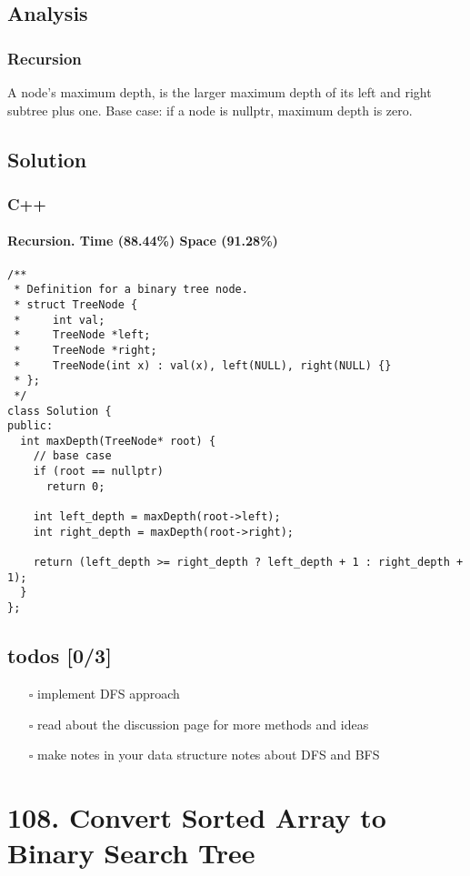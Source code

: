 \documentclass[11pt]{article}
\begin{document}
\subsection{Analysis}
\label{sec:org394cd99}
\subsubsection{Recursion}
\label{sec:org9e3ee56}
A node's maximum depth, is the larger maximum depth of its left and right subtree plus one. Base case: if a node is nullptr, maximum depth is zero.
\subsection{Solution}
\label{sec:org5fc3942}
\subsubsection{C++}
\label{sec:orgf0cf328}
\paragraph{Recursion. Time (88.44\%) Space (91.28\%)}
\label{sec:orgfe04ad5}
\begin{verbatim}
/**
 * Definition for a binary tree node.
 * struct TreeNode {
 *     int val;
 *     TreeNode *left;
 *     TreeNode *right;
 *     TreeNode(int x) : val(x), left(NULL), right(NULL) {}
 * };
 */
class Solution {
public:
  int maxDepth(TreeNode* root) {
    // base case 
    if (root == nullptr)
      return 0;

    int left_depth = maxDepth(root->left);
    int right_depth = maxDepth(root->right);

    return (left_depth >= right_depth ? left_depth + 1 : right_depth + 1);
  }
};
\end{verbatim}
\subsection{todos [0/3]}
\label{sec:orgc063f2a}
\begin{itemize}
\item[{$\square$}] implement DFS approach
\item[{$\square$}] read about the discussion page for more methods and ideas
\item[{$\square$}] make notes in your data structure notes about DFS and BFS
\end{itemize}
\section{108. Convert Sorted Array to Binary Search Tree}
\label{sec:orge0ae903}
\end{document}
